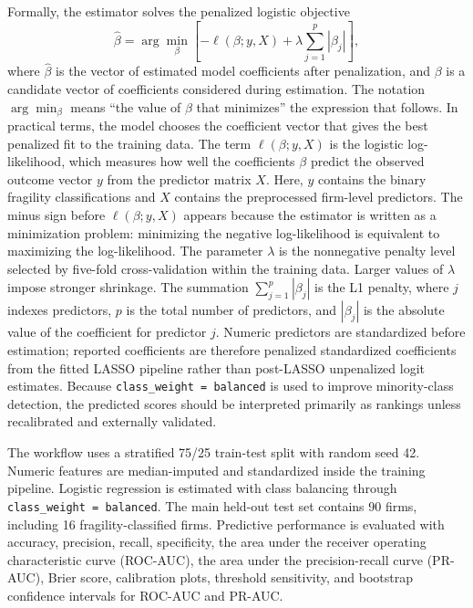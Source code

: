 Formally, the estimator solves the penalized logistic objective
\begin{equation}
\hat{\beta} =
\arg\min_{\beta}
\left[
-\ell(\beta; y, X) + \lambda \sum_{j=1}^{p} |\beta_j|
\right],
\end{equation}
where $\hat{\beta}$ is the vector of estimated model coefficients after penalization, and $\beta$ is a candidate vector of coefficients considered during estimation. The notation $\arg\min_{\beta}$ means ``the value of $\beta$ that minimizes'' the expression that follows. In practical terms, the model chooses the coefficient vector that gives the best penalized fit to the training data. The term $\ell(\beta; y, X)$ is the logistic log-likelihood, which measures how well the coefficients $\beta$ predict the observed outcome vector $y$ from the predictor matrix $X$. Here, $y$ contains the binary fragility classifications and $X$ contains the preprocessed firm-level predictors. The minus sign before $\ell(\beta; y, X)$ appears because the estimator is written as a minimization problem: minimizing the negative log-likelihood is equivalent to maximizing the log-likelihood. The parameter $\lambda$ is the nonnegative penalty level selected by five-fold cross-validation within the training data. Larger values of $\lambda$ impose stronger shrinkage. The summation $\sum_{j=1}^{p} |\beta_j|$ is the L1 penalty, where $j$ indexes predictors, $p$ is the total number of predictors, and $|\beta_j|$ is the absolute value of the coefficient for predictor $j$. Numeric predictors are standardized before estimation; reported coefficients are therefore penalized standardized coefficients from the fitted LASSO pipeline rather than post-LASSO unpenalized logit estimates. Because \texttt{class\_weight = balanced} is used to improve minority-class detection, the predicted scores should be interpreted primarily as rankings unless recalibrated and externally validated.

The workflow uses a stratified 75/25 train-test split with random seed 42. Numeric features are median-imputed and standardized inside the training pipeline. Logistic regression is estimated with class balancing through \texttt{class\_weight = balanced}. The main held-out test set contains 90 firms, including 16 fragility-classified firms. Predictive performance is evaluated with accuracy, precision, recall, specificity, the area under the receiver operating characteristic curve (ROC-AUC), the area under the precision-recall curve (PR-AUC), Brier score, calibration plots, threshold sensitivity, and bootstrap confidence intervals for ROC-AUC and PR-AUC.

